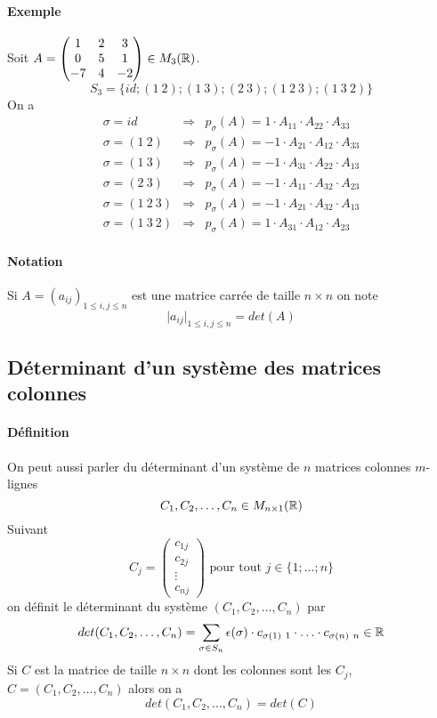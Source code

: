 \paragraph{Exemple} Soit $A = \begin{pmatrix} 1 & 2 & 3 \\ 0 & 5 & 1 \\ -7 & 4 & -2 \end{pmatrix} \in M_{3}(\mathbb{R})$.
$$S_3 = \{id; (1 ~ 2); (1 ~ 3); (2 ~ 3); (1 ~ 2 ~ 3); (1 ~ 3 ~ 2)\}$$
On a 
\begin{eqnarray*}
  \sigma = id           &\Rightarrow& p_{\sigma}(A) = 1 \cdot A_{11} \cdot A_{22} \cdot A_{33} \\
  \sigma = (1 ~ 2)      &\Rightarrow& p_{\sigma}(A) = -1 \cdot A_{21} \cdot A_{12} \cdot A_{33} \\
  \sigma = (1 ~ 3)      &\Rightarrow& p_{\sigma}(A) = -1 \cdot A_{31} \cdot A_{22} \cdot A_{13} \\
  \sigma = (2 ~ 3)      &\Rightarrow& p_{\sigma}(A) = -1 \cdot A_{11} \cdot A_{32} \cdot A_{23} \\
  \sigma = (1 ~ 2 ~ 3)  &\Rightarrow& p_{\sigma}(A) = -1 \cdot A_{21} \cdot A_{32} \cdot A_{13} \\
  \sigma = (1 ~ 3 ~ 2)  &\Rightarrow& p_{\sigma}(A) = 1 \cdot A_{31} \cdot A_{12} \cdot A_{23}
\end{eqnarray*}

\paragraph{Notation} Si $A = (a_{ij})_{1 \leq i, j\leq n}$ est une matrice carrée de taille $n\times n$ on note
$$\vert a_{ij} \vert _{1 \leq i, j \leq n} = det(A)$$

%
\subsection{Déterminant d'un système des matrices colonnes}
%
\paragraph{Définition} On peut aussi parler du déterminant d'un système de $n$ matrices colonnes $m$-lignes
$$C_1, C_2, \ldots, C_n  \in M_{n\times 1}(\mathbb{R})$$
Suivant
$$C_{j} = \begin{pmatrix} c_{1j} \\ c_{2j} \\ \vdots \\ c_{nj} \end{pmatrix} \text{ pour tout } j \in \{1; \ldots ; n\}$$
on définit le déterminant du système $(C_1, C_2, \ldots, C_n)$ par
$$det(C_1, C_2, \ldots, C_n) = \sum_{\sigma \in S_n} \epsilon(\sigma) \cdot c_{\sigma(1) ~ 1} \cdot \ldots \cdot c_{\sigma(n) ~ n} \in \mathbb{R}$$
Si $C$ est la matrice de taille $n \times n$ dont les colonnes sont les $C_j$, $C = (C_1, C_2, \ldots, C_n)$ alors on a
$$det(C_1, C_2, \ldots, C_n) = det(C)$$
